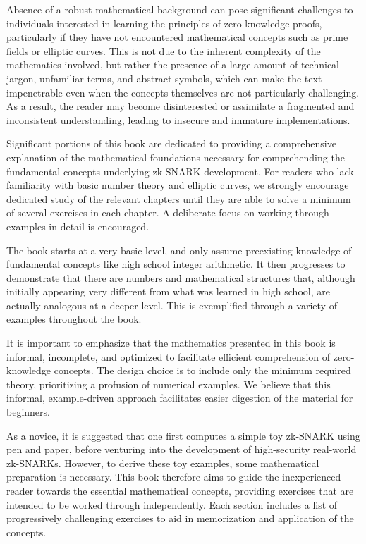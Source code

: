 Absence of a robust mathematical background can pose significant challenges to individuals interested in learning the principles of zero-knowledge proofs, particularly if they have not encountered mathematical concepts such as prime fields or elliptic curves. This is not due to the inherent complexity of the mathematics involved, but rather the presence of a large amount of technical jargon, unfamiliar terms, and abstract symbols, which can make the text impenetrable even when the concepts themselves are not particularly challenging. As a result, the reader may become disinterested or assimilate a fragmented and inconsistent understanding, leading to insecure and immature implementations.

Significant portions of this book are dedicated to providing a comprehensive explanation of the mathematical foundations necessary for comprehending the fundamental concepts underlying zk-SNARK development. For readers who lack familiarity with basic number theory and elliptic curves, we strongly encourage dedicated study of the relevant chapters until they are able to solve a minimum of several exercises in each chapter. A deliberate focus on working through examples in detail is encouraged.

The book starts at a very basic level, and only assume preexisting knowledge of fundamental concepts like high school integer arithmetic. It then progresses to demonstrate that there are numbers and mathematical structures that, although initially appearing very different from what was learned in high school, are actually analogous at a deeper level. This is exemplified through a variety of examples throughout the book.

It is important to emphasize that the mathematics presented in this book is informal, incomplete, and optimized to facilitate efficient comprehension of zero-knowledge concepts. The design choice is to include only the minimum required theory, prioritizing a profusion of numerical examples. We believe that this informal, example-driven approach facilitates easier digestion of the material for beginners.

As a novice, it is suggested that one first computes a simple toy zk-SNARK using pen and paper, before venturing into the development of high-security real-world zk-SNARKs. However, to derive these toy examples, some mathematical preparation is necessary. This book therefore aims to guide the inexperienced reader towards the essential mathematical concepts, providing exercises that are intended to be worked through independently. Each section includes a list of progressively challenging exercises to aid in memorization and application of the concepts.


